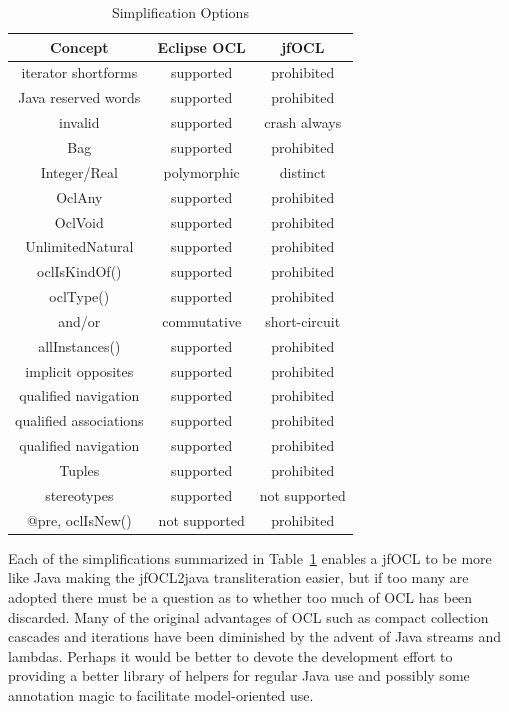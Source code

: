 \documentclass[sigconf]{acmart}
\begin{document}
\begin{table}
\begin{tabular}{ c | c | c }
Concept & Eclipse OCL & jfOCL \\
\hline
iterator shortforms & supported & prohibited \\
Java reserved words & supported & prohibited \\
\hline
invalid & supported & crash always \\
Bag & supported & prohibited \\
Integer/Real & polymorphic & distinct \\
OclAny & supported & prohibited \\
OclVoid & supported & prohibited \\
UnlimitedNatural & supported & prohibited \\
oclIsKindOf() & supported & prohibited \\
oclType() & supported & prohibited \\
and/or & commutative & short-circuit \\
\hline
allInstances() & supported & prohibited \\
implicit opposites & supported & prohibited \\
qualified navigation & supported & prohibited \\
qualified associations & supported & prohibited \\
qualified navigation & supported & prohibited \\
Tuples & supported & prohibited \\
\hline
stereotypes & supported & not supported \\
@pre, oclIsNew() & not supported & prohibited \\
\end{tabular}
\caption{Simplification Options}
\label{tab:Simplifications}
\end{table}

Each of the simplifications summarized in Table~\ref{tab:Simplifications} enables a jfOCL to be more like Java making the jfOCL2java transliteration easier, but if too many are adopted there must be a question as to whether too much of OCL has been discarded. Many of the original advantages of OCL such as compact collection cascades and iterations have been diminished by the advent of Java streams and lambdas. Perhaps it would be better to devote the development effort to providing a better library of helpers for regular Java use and possibly some annotation magic to facilitate model-oriented use.
\end{document}
